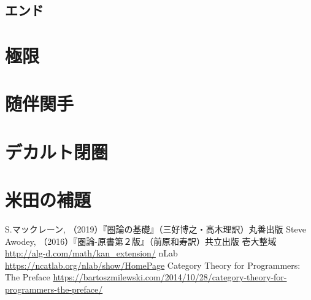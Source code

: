 \documentclass[dvipdfmx]{jsarticle}
\numberwithin{proof}{subsection}
\numberwithin{prop}{subsection}
\numberwithin{define}{subsection}
\begin{document}
	\subsection{エンド}
	\section{極限}
	\section{随伴関手}
	\section{デカルト閉圏}
	\section{米田の補題}

	\begin{thebibliography}{99}
	 S.マックレーン, （2019）『圏論の基礎』（三好博之・高木理訳）丸善出版
	 Steve Awodey, （2016）『圏論-原書第２版』（前原和寿訳）共立出版
	 壱大整域 \url{http://alg-d.com/math/kan_extension/}
	 nLab \url{https://ncatlab.org/nlab/show/HomePage}
	 Category Theory for Programmers: The Preface \url{https://bartoszmilewski.com/2014/10/28/category-theory-for-programmers-the-preface/}
	\end{thebibliography}
\end{document}
